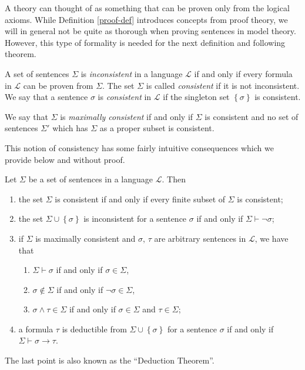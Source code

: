 \documentclass[../../main.tex]{subfiles}
\begin{document}
A theory can thought of as something that can be proven only from the logical axioms.
While Definition \ref{proof-def} introduces concepts from proof theory, we will in general not be quite as thorough when proving sentences in model theory.
However, this type of formality is needed for the next definition and following theorem.

\begin{definition}[Consistency]\cite[p.25]{Cha90}
    A set of sentences $\Sigma$ is \emph{inconsistent} in a language $\mathcal{L}$ if and only if every formula in $\mathcal{L}$ can be proven from $\Sigma$.
    The set $\Sigma$ is called \emph{consistent} if it is not inconsistent.
    We say that a sentence $\sigma$ is \emph{consistent} in $\mathcal{L}$ if the singleton set $\left\{\sigma\right\}$ is consistent.

    We say that $\Sigma$ is \emph{maximally consistent} if and only if $\Sigma$ is consistent 
    and no set of sentences $\Sigma'$ which has $\Sigma$ as a proper subset is consistent.
\end{definition}  

This notion of consistency has some fairly intuitive consequences which we provide below and without proof.

\begin{proposition}\label{consistency-prop}\cite[Proposition 1.3.10.]{Cha90}
    Let $\Sigma$ be a set of sentences in a language $\mathcal{L}$. Then
    \begin{enumerate}
        \item the set $\Sigma$ is consistent if and only if every finite subset of $\Sigma$ is consistent;
        \item the set $\Sigma \cup \left\{\sigma\right\}$ is inconsistent for a sentence $\sigma$ if and only if $\Sigma \vdash \lnot \sigma$;
        \item if $\Sigma$ is maximally consistent and $\sigma,\, \tau$ are arbitrary sentences in $\mathcal{L}$, we have that
        \begin{enumerate}[label=(\roman*)]
            \item $\Sigma \vdash \sigma$ if and only if $\sigma \in \Sigma$,
            \item $\sigma \not\in \Sigma$ if and only if $\lnot \sigma \in \Sigma$,
            \item $\sigma \wedge \tau \in \Sigma$ if and only if $\sigma \in \Sigma$ and $\tau \in \Sigma$;
        \end{enumerate}
        \item a formula $\tau$ is deductible from $\Sigma \cup \left\{\sigma\right\}$ for a sentence $\sigma$ if and only if $\Sigma \vdash \sigma \rightarrow \tau$.
    \end{enumerate}

    The last point is also known as the ``Deduction Theorem''.
\end{proposition}
\end{document}
